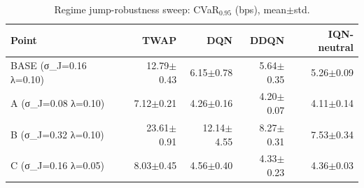\begin{table}[H]\centering
\caption{Regime jump-robustness sweep: CVaR$_{0.95}$ (bps), mean$\pm$std.}
\label{tab:v2_regime_robustness}
\begin{tabular}{@{}lrrrr@{}}
\toprule
Point & TWAP & DQN & DDQN & IQN-neutral \\
\midrule
BASE (σ_J=0.16 λ=0.10) & 12.79$\pm$0.43 & 6.15$\pm$0.78 & 5.64$\pm$0.35 & 5.26$\pm$0.09 \\
A (σ_J=0.08 λ=0.10) & 7.12$\pm$0.21 & 4.26$\pm$0.16 & 4.20$\pm$0.07 & 4.11$\pm$0.14 \\
B (σ_J=0.32 λ=0.10) & 23.61$\pm$0.91 & 12.14$\pm$4.55 & 8.27$\pm$0.31 & 7.53$\pm$0.34 \\
C (σ_J=0.16 λ=0.05) & 8.03$\pm$0.45 & 4.56$\pm$0.40 & 4.33$\pm$0.23 & 4.36$\pm$0.03 \\
\bottomrule
\end{tabular}
\end{table}
